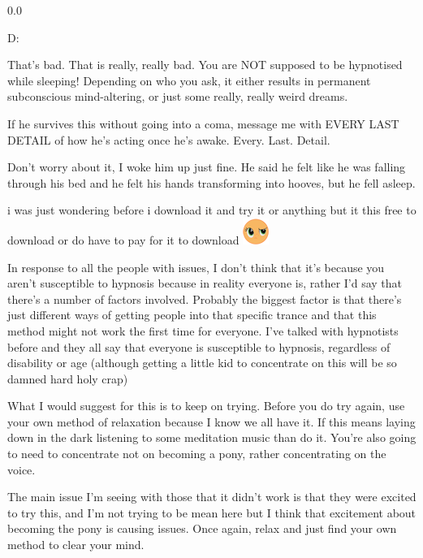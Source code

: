 \documentclass[ebook,12pt,oneside,openany]{memoir}
\newcommand{\mytexttilde}{\raisebox{0.5ex}{\texttildelow}}
\begin{document}
\begin{tcolorbox}[title=Mr. Forest]
\begin{tcolorbox}[title=Asquerade]
\par{0.0}
\newline{}
\par{D:}
\newline{}
\par{That's bad. That is really, really bad. You are NOT supposed to be hypnotised while sleeping! Depending on who you ask, it either results in permanent subconscious mind-altering, or just some really, really weird dreams.}
\newline{}
\par{If he survives this without going into a coma, message me with EVERY LAST DETAIL of how he's acting once he's awake. Every. Last. Detail.}
\end{tcolorbox}
\par{Don't worry about it, I woke him up just fine.  He said he felt like he was falling through his bed and he felt his hands transforming into hooves, but he fell asleep.}
\end{tcolorbox}
\begin{tcolorbox}[title=\mytexttilde{}TheStealthyPony\mytexttilde{},colback=yellow!5!white,colframe=yellow!75!black,coltitle=white]
\par{i was just wondering before i download it and try it or anything but it this free to download or do have to pay for it to download \includegraphics{images/mlp_huh.png}}
\end{tcolorbox}
\begin{tcolorbox}[title=Lord Bababa,colback=red!5!white,colframe=red!75!black,coltitle=white]
\par{In response to all the people with issues, I don't think that it's because you aren't susceptible to hypnosis because in reality everyone is, rather I'd say that there's a number of factors involved. Probably the biggest factor is that there's just different ways of getting people into that specific trance and that this method might not work the first time for everyone. I've talked with hypnotists before and they all say that everyone is susceptible to hypnosis, regardless of disability or age (although getting a little kid to concentrate on this will be so damned hard holy crap)}
\newline{}
\par{What I would suggest for this is to keep on trying. Before you do try again, use your own method of relaxation because I know we all have it. If this means laying down in the dark listening to some meditation music than do it. You're also going to need to concentrate not on becoming a pony, rather concentrating on the voice.}
\newline{}
\par{The main issue I'm seeing with those that it didn't work is that they were excited to try this, and I'm not trying to be mean here but I think that excitement about becoming the pony is causing issues. Once again, relax and just find your own method to clear your mind.}
\end{tcolorbox}
\end{document}
